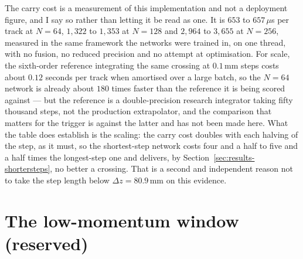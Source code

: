 \documentclass[11pt,a4paper]{article}
\newcommand{\mm}{\ensuremath{\,\mathrm{mm}}}
\begin{document}
The carry cost is a measurement of this implementation and not a deployment
figure, and I say so rather than letting it be read as one. It is $653$ to
$657\,\mu$s per track at $N = 64$, $1{,}322$ to $1{,}353$ at $N = 128$ and
$2{,}964$ to $3{,}655$ at $N = 256$, measured in the same framework the
networks were trained in, on one thread, with no fusion, no reduced precision
and no attempt at optimisation. For scale, the sixth-order reference integrating
the same crossing at $0.1\mm$ steps costs about $0.12$ seconds per track when
amortised over a large batch, so the $N = 64$ network is already about $180$
times faster than the reference it is being scored against --- but the reference
is a double-precision research integrator taking fifty thousand steps, not the
production extrapolator, and the comparison that matters for the trigger is
against the latter and has not been made here. What the table does establish is
the scaling: the carry cost doubles with each halving of the step, as it must,
so the shortest-step network costs four and a half to five and a half times the
longest-step one and
delivers, by Section~\ref{sec:results-shortersteps}, no better a crossing. That
is a second and independent reason not to take the step length below
$\Delta z = 80.9\mm$ on this evidence.

\section{The low-momentum window (reserved)}
\label{sec:lowmom}

\begin{quote}
\end{quote}
\end{document}
